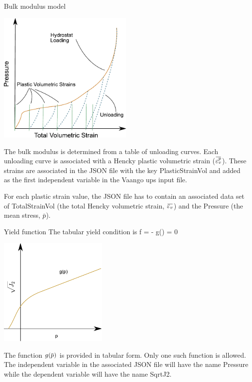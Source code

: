 \begin{SummaryBox}[label=box:TableBulkModulusModel]{Bulk modulus model}
  \begin{center}
    \includegraphics[width=0.5\textwidth]{MPMMaterials/FIGS/TabularHydrostat.pdf}
  \end{center}

  The bulk modulus is determined from a table of unloading curves.  Each unloading 
  curve is associated with a Hencky plastic volumetric strain ($\bar{\Veps_v^p}$).
  These strains are associated in the JSON file with the key \textsf{PlasticStrainVol}
  and added as the first independent variable in the Vaango \textsf{ups} input file.

  For each plastic strain value, the JSON file has to contain an associated data
  set of \textsf{TotalStrainVol} (the total Hencky volumetric strain, $\bar{\Veps_v}$)
  and the \textsf{Pressure} (the mean stress, $\bar{p}$).
\end{SummaryBox}

\begin{SummaryBox}[label=box:TableYieldFunction]{Yield function}
  The tabular yield condition is
  \Beq
     f =  - g(\pbar) = 0
  \Eeq
  \begin{center}
    \includegraphics[width=0.4\textwidth]{MPMMaterials/FIGS/TabularYieldFn.pdf}
  \end{center}
  The function $g(\pbar)$ is provided in tabular form.  Only one such function is
  allowed.  The independent variable in the associated JSON file will have the name
  \textsf{Pressure} while the dependent variable will have the name \textsf{SqrtJ2}.
\end{SummaryBox}



